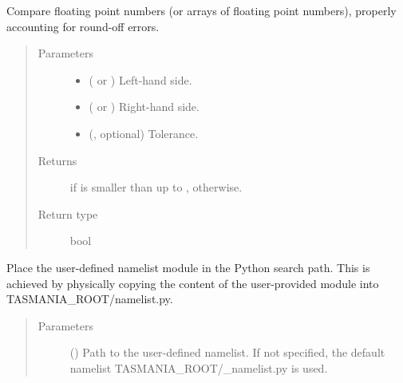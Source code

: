 \documentclass[letterpaper,10pt,english]{sphinxmanual}
\begin{document}
\begin{fulllineitems}
\label{\detokenize{api:tasmania.utils.utils.smaller_than}}
Compare floating point numbers (or arrays of floating point numbers), properly accounting for round-off errors.
\begin{quote}\begin{description}
\item[{Parameters}] \leavevmode\begin{itemize}
\item {} 
 ( or ) \textendash{} Left-hand side.

\item {} 
 ( or ) \textendash{} Right-hand side.

\item {} 
 (, optional) \textendash{} Tolerance.

\end{itemize}

\item[{Returns}] \leavevmode
{} if  is smaller than  up to ,  otherwise.

\item[{Return type}] \leavevmode
bool

\end{description}\end{quote}

\end{fulllineitems}

\label{\detokenize{api:module-tasmania.set_namelist}}

\begin{fulllineitems}
\label{\detokenize{api:tasmania.set_namelist.set_namelist}}
Place the user-defined namelist module in the Python search path.
This is achieved by physically copying the content of the user-provided module into TASMANIA\_ROOT/namelist.py.
\begin{quote}\begin{description}
\item[{Parameters}] \leavevmode
{} () \textendash{} Path to the user-defined namelist. If not specified, the default namelist TASMANIA\_ROOT/\_namelist.py is used.

\end{description}\end{quote}

\end{fulllineitems}
\end{document}
